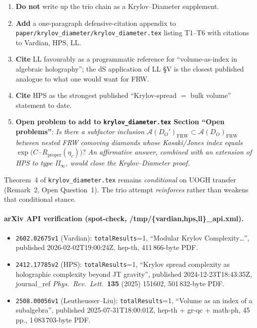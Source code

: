 \documentclass[11pt]{article}
\newcommand{\AA}{\mathcal{A}}
\newcommand{\FRW}{\mathrm{FRW}}
\newcommand{\Rprop}{R_{\mathrm{proper}}}
\begin{document}
\begin{enumerate}
\item \textbf{Do not} write up the trio chain as a Krylov--Diameter supplement.
\item \textbf{Add} a one-paragraph defensive-citation appendix to
\texttt{paper/krylov\_diameter/krylov\_diameter.tex} listing T1--T6 with citations
to Vardian, HPS, LL.
\item \textbf{Cite} LL favourably as a programmatic reference for ``volume-as-index in
algebraic holography''; the dS application of LL \S{}V is the closest published
analogue to what one would want for FRW.
\item \textbf{Cite} HPS as the strongest published ``Krylov-spread $=$ bulk volume''
statement to date.
\item \textbf{Open problem to add to \texttt{krylov\_diameter.tex} Section ``Open
problems''}: \emph{Is there a subfactor inclusion}
$\AA(D_O')_\FRW \subset \AA(D_O)_\FRW$ \emph{between nested FRW comoving diamonds
whose Kosaki/Jones index equals} $\exp\!\big(C\cdot\Rprop(\eta_c)\big)$?
\emph{An affirmative answer, combined with an extension of HPS to type II$_\infty$,
would close the Krylov--Diameter proof.}
\end{enumerate}

Theorem~4 of \texttt{krylov\_diameter.tex} remains \emph{conditional} on UOGH
transfer (Remark~2, Open Question~1). The trio attempt \emph{reinforces} rather
than weakens that conditional stance.

\paragraph{arXiv API verification (spot-check, /tmp/\{vardian,hps,ll\}\_api.xml).}
\begin{itemize}
\item \texttt{2602.02675v1} (Vardian): \texttt{totalResults}=1, ``Modular Krylov
Complexity\dots'', published 2026-02-02T19:00:24Z, hep-th, 411\,866-byte PDF.
\item \texttt{2412.17785v2} (HPS): \texttt{totalResults}=1, ``Krylov spread
complexity as holographic complexity beyond JT gravity'', published
2024-12-23T18:43:35Z, journal\_ref \emph{Phys.\ Rev.\ Lett.}\ \textbf{135}
(2025) 151602, 501\,832-byte PDF.
\item \texttt{2508.00056v1} (Leutheusser--Liu): \texttt{totalResults}=1,
``Volume as an index of a subalgebra'', published 2025-07-31T18:00:01Z,
hep-th + gr-qc + math-ph, 45 pp., 1\,083\,703-byte PDF.
\end{itemize}
\end{document}
